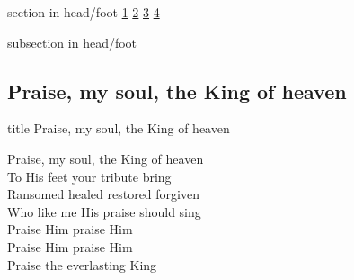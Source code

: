 \documentclass{beamer}
\begin{document}
{
{ 
 {
 \begin{beamercolorbox}[ht=4.5ex,dp=1.5ex,%
      leftskip=.3cm,rightskip=.3cm plus1fil]{section in head/foot}
 \fontsize{12}{25}\selectfont 
\hyperlink{Praise, my soul, the King of heaven[]1}{1}
\hyperlink{Praise, my soul, the King of heaven[]2}{2}
\hyperlink{Praise, my soul, the King of heaven[]3}{3}
\hyperlink{Praise, my soul, the King of heaven[]4}{4}
 
 \end{beamercolorbox}%
  \begin{beamercolorbox}[ht=2.5ex,dp=1.125ex,%
   leftskip=.3cm,rightskip=.3cm plus1fil]{subsection in head/foot}
   \insertauthor
 \end{beamercolorbox}%
 }
}
\subsection{ Praise, my soul, the King of heaven }

\hypertarget{Praise, my soul, the King of heaven[]}{}
\begin{frame}{}
 \vfill
  \centering
  \begin{beamercolorbox}[sep=8pt,center,shadow=true,rounded=true]{title}
    Praise, my soul, the King of heaven     
  \end{beamercolorbox}
  \vfill
\end{frame}

\hypertarget{Praise, my soul, the King of heaven[]1}{}
\begin{frame}{}
\fontsize{ 20 }{ 27 }\selectfont

Praise, my soul, the King of heaven\\ 
To His feet your tribute bring\\ 
Ransomed healed restored forgiven\\ 
Who like me His praise should sing\\ 
Praise Him praise Him\\ 
Praise Him praise Him\\ 
Praise the everlasting King 

\end{frame}

\hypertarget{Praise, my soul, the King of heaven[]2}{}
\begin{frame}{}
\fontsize{ 20 }{ 27 }\selectfont


\end{frame}}
\end{document}

